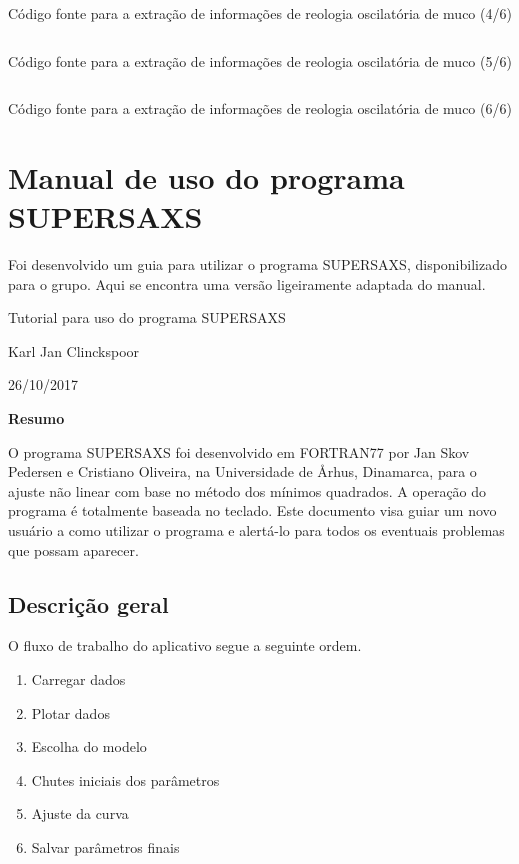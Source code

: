 \begin{apendicesenv}
\begin{listing}[H]
	\inputminted{python}{./python/extracao_muco4.py}
	\caption{Código fonte para a extração de informações de reologia oscilatória de muco (4/6)} 
	\label{lst:extracao_muco4}
\end{listing}

\begin{listing}[H]
	\inputminted{python}{./python/extracao_muco5.py}
	\caption{Código fonte para a extração de informações de reologia oscilatória de muco (5/6)}
	\label{lst:extracao_muco5}
\end{listing}

\begin{listing}[H]
	\inputminted{python}{./python/extracao_muco6.py}
	\caption{Código fonte para a extração de informações de reologia oscilatória de muco (6/6)} 
	\label{lst:extracao_muco6}
\end{listing}


\section{Manual de uso do programa SUPERSAXS}
\label{sec:manual_SUPERSAXS}
Foi desenvolvido um guia para utilizar o programa SUPERSAXS, disponibilizado para o grupo. Aqui se encontra uma versão ligeiramente adaptada do manual.

\begin{center}
	\Huge{Tutorial para uso do programa SUPERSAXS}
	
	\Large{Karl Jan Clinckspoor}
	
	\large{26/10/2017}
\end{center}

\textbf{Resumo}

O programa SUPERSAXS foi desenvolvido em FORTRAN77 por Jan Skov Pedersen e Cristiano Oliveira, na Universidade de Århus, Dinamarca, para o ajuste não linear com base no método dos mínimos quadrados. A operação do programa é totalmente baseada no teclado. Este documento visa guiar um novo usuário a como utilizar o programa e alertá-lo para todos os eventuais problemas que possam aparecer.


\subsection*{Descrição geral}

O fluxo de trabalho do aplicativo segue a seguinte ordem.

\begin{enumerate}
	\item Carregar dados
	\item Plotar dados
	\item Escolha do modelo
	\item Chutes iniciais dos parâmetros
	\item Ajuste da curva
	\item Salvar parâmetros finais
\end{enumerate}


\end{apendicesenv}
